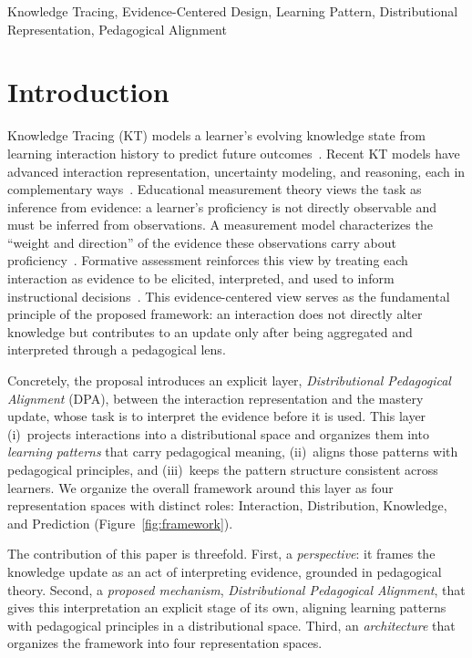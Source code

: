 \documentclass[conference]{IEEEtran}
\begin{document}
\begin{IEEEkeywords}
Knowledge Tracing, Evidence-Centered Design, Learning Pattern, Distributional Representation, Pedagogical Alignment
\end{IEEEkeywords}

\section{Introduction}
\label{sec:intro}

Knowledge Tracing (KT) models a learner's evolving knowledge state from learning interaction history to predict future outcomes~\cite{corbett1994kt, piech2015dkt}. Recent KT models have advanced interaction representation, uncertainty modeling, and reasoning, each in complementary ways~\cite{li2025mckt, xia2025cmdkt, chen2025ukt, li2025keenkt, wu2026sskt, nakagawa2019gkt, zhou2024psikt, hooshyar2026nskt, wu2026plkt}. Educational measurement theory views the task as inference from evidence: a learner's proficiency is not directly observable and must be inferred from observations. A measurement model characterizes the ``weight and direction'' of the evidence these observations carry about proficiency~\cite{mislevy2005ecd}. Formative assessment reinforces this view by treating each interaction as evidence to be elicited, interpreted, and used to inform instructional decisions~\cite{black2009formative}. This evidence-centered view serves as the fundamental principle of the proposed framework: an interaction does not directly alter knowledge but contributes to an update only after being aggregated and interpreted through a pedagogical lens.

Concretely, the proposal introduces an explicit layer, \emph{Distributional Pedagogical Alignment} (DPA), between the interaction representation and the mastery update, whose task is to interpret the evidence before it is used. This layer (i)~projects interactions into a distributional space and organizes them into \emph{learning patterns} that carry pedagogical meaning, (ii)~aligns those patterns with pedagogical principles, and (iii)~keeps the pattern structure consistent across learners. We organize the overall framework around this layer as four representation spaces with distinct roles: Interaction, Distribution, Knowledge, and Prediction (Figure~\ref{fig:framework}).

The contribution of this paper is threefold. First, a \emph{perspective}: it frames the knowledge update as an act of interpreting evidence, grounded in pedagogical theory. Second, a \emph{proposed mechanism}, \emph{Distributional Pedagogical Alignment}, that gives this interpretation an explicit stage of its own, aligning learning patterns with pedagogical principles in a distributional space. Third, an \emph{architecture} that organizes the framework into four representation spaces.
\end{document}
